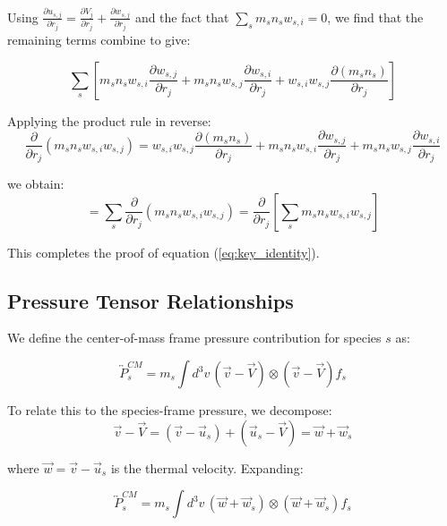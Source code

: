 Using $\frac{\partial u_{s,j}}{\partial r_j} = \frac{\partial V_j}{\partial r_j} + \frac{\partial w_{s,j}}{\partial r_j}$ and the fact that $\sum_s m_s n_s w_{s,i} = 0$, we find that the remaining terms combine to give:

\begin{equation*}
\sum_s \left[m_s n_s w_{s,i} \frac{\partial w_{s,j}}{\partial r_j} + m_s n_s w_{s,j} \frac{\partial w_{s,i}}{\partial r_j} + w_{s,i} w_{s,j} \frac{\partial (m_s n_s)}{\partial r_j}\right]
\end{equation*}

Applying the product rule in reverse:
\begin{equation*}
\frac{\partial}{\partial r_j}(m_s n_s w_{s,i} w_{s,j}) = w_{s,i} w_{s,j} \frac{\partial (m_s n_s)}{\partial r_j} + m_s n_s w_{s,i} \frac{\partial w_{s,j}}{\partial r_j} + m_s n_s w_{s,j} \frac{\partial w_{s,i}}{\partial r_j}
\end{equation*}

we obtain:
\begin{equation*}
= \sum_s \frac{\partial}{\partial r_j}(m_s n_s w_{s,i} w_{s,j}) = \frac{\partial}{\partial r_j}\left[\sum_s m_s n_s w_{s,i} w_{s,j}\right]
\end{equation*}

This completes the proof of equation (\ref{eq:key_identity}).

\subsection{Pressure Tensor Relationships}

We define the center-of-mass frame pressure contribution for species $s$ as:

\begin{equation*}
\overleftrightarrow{P}_s^{CM} = m_s \int d^3v \, (\vec{v} - \vec{V}) \otimes (\vec{v} - \vec{V}) f_s
\end{equation*}

To relate this to the species-frame pressure, we decompose:
\begin{equation*}
\vec{v} - \vec{V} = (\vec{v} - \vec{u}_s) + (\vec{u}_s - \vec{V}) = \vec{w} + \vec{w}_s
\end{equation*}

where $\vec{w} = \vec{v} - \vec{u}_s$ is the thermal velocity. Expanding:

\begin{equation*}
\overleftrightarrow{P}_s^{CM} = m_s \int d^3v \, (\vec{w} + \vec{w}_s) \otimes (\vec{w} + \vec{w}_s) f_s
\end{equation*}

